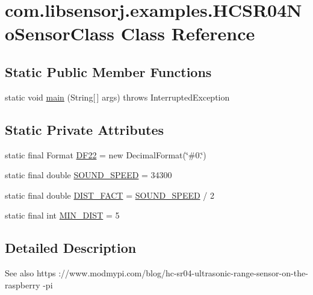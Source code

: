 \hypertarget{classcom_1_1libsensorj_1_1examples_1_1HCSR04NoSensorClass}{}\section{com.\+libsensorj.\+examples.\+H\+C\+S\+R04\+No\+Sensor\+Class Class Reference}
\label{classcom_1_1libsensorj_1_1examples_1_1HCSR04NoSensorClass}
\subsection*{Static Public Member Functions}
\begin{DoxyCompactItemize}
\item 
static void \hyperlink{classcom_1_1libsensorj_1_1examples_1_1HCSR04NoSensorClass_abbbd349b6d62a9488da92b355a3f01ff}{main} (String\mbox{[}$\,$\mbox{]} args)  throws Interrupted\+Exception 
\end{DoxyCompactItemize}
\subsection*{Static Private Attributes}
\begin{DoxyCompactItemize}
\item 
static final Format \hyperlink{classcom_1_1libsensorj_1_1examples_1_1HCSR04NoSensorClass_a41338744496f40c7e80f4faf93bac304}{D\+F22} = new Decimal\+Format(\char`\"{}\#0.\char`\"{})
\item 
static final double \hyperlink{classcom_1_1libsensorj_1_1examples_1_1HCSR04NoSensorClass_aae05bb29da08230984f93f167de14ee6}{S\+O\+U\+N\+D\+\_\+\+S\+P\+E\+E\+D} = 34300
\item 
static final double \hyperlink{classcom_1_1libsensorj_1_1examples_1_1HCSR04NoSensorClass_a447e78595330f5f3be7717047ede01d0}{D\+I\+S\+T\+\_\+\+F\+A\+C\+T} = \hyperlink{classcom_1_1libsensorj_1_1examples_1_1HCSR04NoSensorClass_aae05bb29da08230984f93f167de14ee6}{S\+O\+U\+N\+D\+\_\+\+S\+P\+E\+E\+D} / 2
\item 
static final int \hyperlink{classcom_1_1libsensorj_1_1examples_1_1HCSR04NoSensorClass_a1c873dc1361c25c0c972a4836d8f1169}{M\+I\+N\+\_\+\+D\+I\+S\+T} = 5
\end{DoxyCompactItemize}


\subsection{Detailed Description}
\begin{DoxySeeAlso}{See also}
https \+://www.modmypi.\+com/blog/hc-\/sr04-\/ultrasonic-\/range-\/sensor-\/on-\/the-\/raspberry -\/pi 
\end{DoxySeeAlso}


